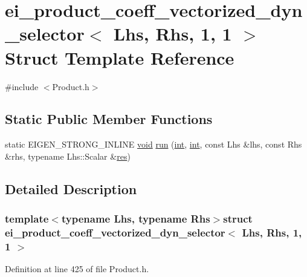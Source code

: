 \hypertarget{structei__product__coeff__vectorized__dyn__selector_3_01_lhs_00_01_rhs_00_011_00_011_01_4}{\section{ei\-\_\-product\-\_\-coeff\-\_\-vectorized\-\_\-dyn\-\_\-selector$<$ Lhs, Rhs, 1, 1 $>$ Struct Template Reference}
\label{structei__product__coeff__vectorized__dyn__selector_3_01_lhs_00_01_rhs_00_011_00_011_01_4}
}


{\ttfamily \#include $<$Product.\-h$>$}

\subsection*{Static Public Member Functions}
\begin{DoxyCompactItemize}
\item 
static E\-I\-G\-E\-N\-\_\-\-S\-T\-R\-O\-N\-G\-\_\-\-I\-N\-L\-I\-N\-E \hyperlink{group___u_a_v_objects_plugin_ga444cf2ff3f0ecbe028adce838d373f5c}{void} \hyperlink{structei__product__coeff__vectorized__dyn__selector_3_01_lhs_00_01_rhs_00_011_00_011_01_4_a92e4ad7f318b9cfb55ec862594d7261c}{run} (\hyperlink{ioapi_8h_a787fa3cf048117ba7123753c1e74fcd6}{int}, \hyperlink{ioapi_8h_a787fa3cf048117ba7123753c1e74fcd6}{int}, const Lhs \&lhs, const Rhs \&rhs, typename Lhs\-::\-Scalar \&\hyperlink{glext_8h_a1dbb21208b9047cc8031ca9c840d3c2f}{res})
\end{DoxyCompactItemize}


\subsection{Detailed Description}
\subsubsection*{template$<$typename Lhs, typename Rhs$>$struct ei\-\_\-product\-\_\-coeff\-\_\-vectorized\-\_\-dyn\-\_\-selector$<$ Lhs, Rhs, 1, 1 $>$}



Definition at line 425 of file Product.\-h.



